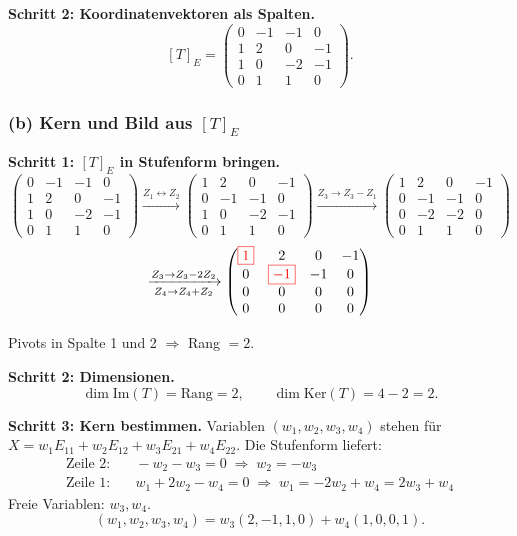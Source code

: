 \documentclass[a4paper,12pt]{article}
\newcommand{\piv}[1]{{\color{red}\boxed{#1}}}
\begin{document}
\textbf{Schritt 2: Koordinatenvektoren als Spalten.}
\[
[T]_E = \begin{pmatrix}
0 & -1 & -1 & 0 \\
1 & 2 & 0 & -1 \\
1 & 0 & -2 & -1 \\
0 & 1 & 1 & 0
\end{pmatrix}.
\]

\subsubsection*{(b) Kern und Bild aus $[T]_E$}

\textbf{Schritt 1: $[T]_E$ in Stufenform bringen.}
\[
\begin{pmatrix}
0 & -1 & -1 & 0 \\
1 & 2 & 0 & -1 \\
1 & 0 & -2 & -1 \\
0 & 1 & 1 & 0
\end{pmatrix}
\xrightarrow{Z_1 \leftrightarrow Z_2}
\begin{pmatrix}
1 & 2 & 0 & -1 \\
0 & -1 & -1 & 0 \\
1 & 0 & -2 & -1 \\
0 & 1 & 1 & 0
\end{pmatrix}
\xrightarrow{Z_3 \to Z_3 - Z_1}
\begin{pmatrix}
1 & 2 & 0 & -1 \\
0 & -1 & -1 & 0 \\
0 & -2 & -2 & 0 \\
0 & 1 & 1 & 0
\end{pmatrix}
\]
\[
\xrightarrow[Z_4 \to Z_4 + Z_2]{Z_3 \to Z_3 - 2Z_2}
\begin{pmatrix}
\piv{1} & 2 & 0 & -1 \\
0 & \piv{-1} & -1 & 0 \\
0 & 0 & 0 & 0 \\
0 & 0 & 0 & 0
\end{pmatrix}
\]

Pivots in Spalte 1 und 2 $\Rightarrow$ Rang $= 2$.

\textbf{Schritt 2: Dimensionen.}
\[
\dim \text{Im}(T) = \text{Rang} = 2, \qquad \dim \text{Ker}(T) = 4 - 2 = 2.
\]

\textbf{Schritt 3: Kern bestimmen.} Variablen $(w_1, w_2, w_3, w_4)$ stehen f\"ur $X = w_1 E_{11} + w_2 E_{12} + w_3 E_{21} + w_4 E_{22}$. Die Stufenform liefert:
\begin{align*}
\text{Zeile 2:} &\quad -w_2 - w_3 = 0 \;\Rightarrow\; w_2 = -w_3 \\
\text{Zeile 1:} &\quad w_1 + 2w_2 - w_4 = 0 \;\Rightarrow\; w_1 = -2w_2 + w_4 = 2w_3 + w_4
\end{align*}
Freie Variablen: $w_3, w_4$.
\[
(w_1, w_2, w_3, w_4) = w_3(2, -1, 1, 0) + w_4(1, 0, 0, 1).
\]
\end{document}
